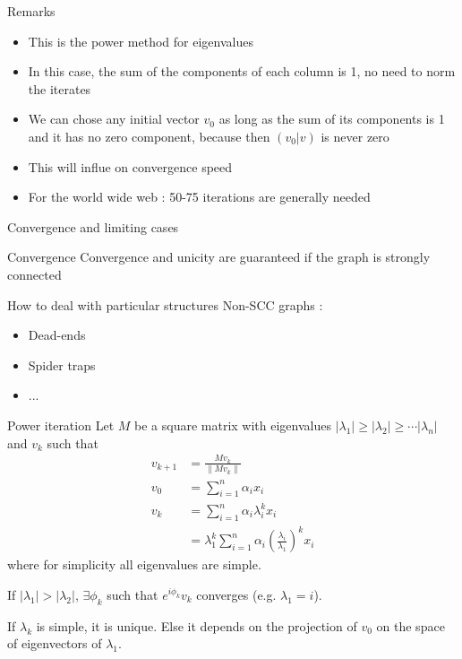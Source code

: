 \documentclass[10pt]{beamer}
\begin{document}
\begin{frame}{Remarks}
\begin{itemize}
\item This is the power method for eigenvalues
\item In this case, the sum of the components of each column is 1, no need to norm the iterates
\item We can chose any initial vector $v_0$ as long as the sum of its components is 1 and it has no zero component, because then $(v_0|v)$ is never zero
\item This will influe on convergence speed
\item For the world wide web : 50-75 iterations are generally needed
\end{itemize}
\end{frame}

\begin{frame}{Convergence and limiting cases}
\begin{block}{Convergence}
Convergence and unicity are guaranteed if the graph is strongly connected
\end{block}
\begin{block}{How to deal with particular structures}
Non-SCC graphs :
\begin{itemize}
\item Dead-ends
\item Spider traps
\item ...
\end{itemize}
\end{block}
\end{frame}


\begin{frame}{Power iteration}
  Let $M$ be a square matrix with eigenvalues $|\lambda_1| \geq |\lambda_2| \geq \cdots |\lambda_n|$ and
  $v_k$ such that
  \begin{align*}
    v_{k+1} & = \frac{Mv_k}{\|Mv_k\|}\\
    v_0 & = \sum_{i=1}^n \alpha_i x_i\\
    v_k & = \sum_{i=1}^n \alpha_i \lambda_i^k x_i\\
        & = \lambda_1^k \sum_{i=1}^n \alpha_i \left(\frac{\lambda_i}{\lambda_1}\right)^k x_i
  \end{align*}
  where for simplicity all eigenvalues are simple.


  If $|\lambda_1| > |\lambda_2|$, $\exists \phi_k$ such that $e^{i\phi_k}v_k$ converges (e.g. $\lambda_1 = i$).

  If $\lambda_k$ is simple, it is unique.
  Else it depends on the projection of $v_0$ on the space of eigenvectors of $\lambda_1$.
\end{frame}
\end{document}
